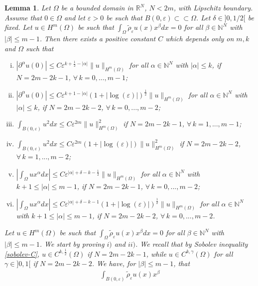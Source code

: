\documentclass[11pt,a4paper]{amsart}
\numberwithin{equation}{section}
\newtheorem{lemma}[equation]{Lemma}
\begin{document}
\begin{lemma}\label{meanlemma}
Let $\Omega$ be a bounded domain in $\mathbb R^N$, $N<2m$, with Lipschitz boundary. Assume that $0\in\Omega$ and let $\varepsilon>0$ be such that $B(0,\varepsilon)\subset\subset\Omega$. Let $\delta\in]0,1/2[$ be fixed. Let $u\in H^m(\Omega)$ be such that $\int_{\Omega}\tilde\rho_{\varepsilon} u(x) x^{\beta} dx=0$ for all $\beta\in\mathbb N^N$ with $|\beta|\leq m-1$. Then there exists a positive constant $C$ which depends only on $m,k$ and $\Omega$ such that
\begin{enumerate}[i)]
\item $|\partial^{\alpha}u(0)|\leq C\varepsilon^{k+\frac{1}{2}-|\alpha|}\|u\|_{H^m(\Omega)}$ for all $\alpha\in\mathbb N^N$ with $|\alpha|\leq k$, if $N=2m-2k-1$, $\forall\,k=0,...,m-1$;
\item $|\partial^{\alpha}u(0)|\leq C\varepsilon^{k+1-|\alpha|}(1+|\log(\varepsilon)|)^{\frac{1}{2}}\|u\|_{H^m(\Omega)}$ for all $\alpha\in\mathbb N^N$ with $|\alpha|\leq k$,  if $N=2m-2k-2$, $\forall\,k=0,...,m-2$;
\item $\int_{B(0,\varepsilon)}u^2dx\leq C\varepsilon^{2m}\|u\|_{H^m(\Omega)}^2$ if $N=2m-2k-1$, $\forall\,k=1,...,m-1$;
\item $\int_{B(0,\varepsilon)}u^2dx\leq C\varepsilon^{2m} (1+|\log(\varepsilon)|)\|u\|_{H^m(\Omega)}^2$ if $N=2m-2k-2$, $\forall\,k=1,...,m-2$;
\item $\left|\int_{\Omega}u x^{\alpha}dx\right|\leq C\varepsilon^{|\alpha|+\delta-k-\frac{1}{2}}\|u\|_{H^m(\Omega)}$ for all $\alpha\in\mathbb N^N$ with $k+1\leq|\alpha|\leq m-1$,  if $N=2m-2k-1$, $\forall\,k=0,...,m-2$;
\item $\left|\int_{\Omega}u x^{\alpha}dx\right|\leq C\varepsilon^{|\alpha|+\delta-k-1}(1+|\log(\varepsilon)|)^{\frac{1}{2}}\|u\|_{H^m(\Omega)}$ for all $\alpha\in\mathbb N^N$ with $k+1\leq|\alpha|\leq m-1$,  if $N=2m-2k-2$, $\forall\,k=0,...,m-2$.
\end{enumerate}
\proof
Let $u\in H^m(\Omega)$ be such that $\int_{\Omega}\tilde\rho_{\varepsilon} u(x) x^{\beta} dx=0$ for all $\beta\in\mathbb N^N$ with $|\beta|\leq m-1$. We start by proving $i)$ and $ii)$. We recall that by Sobolev inequality \eqref{sobolev-C}, $u\in C^{k,\frac{1}{2}}(\Omega)$ if $N=2m-2k-1$, while $u\in C^{k,\gamma}(\Omega)$ for all $\gamma\in]0,1[$ if $N=2m-2k-2$.  We have, for $|\beta|\leq m-1$, that
\begin{multline}\label{ultimo}
\int_{B(0,\varepsilon)}\tilde\rho_{\varepsilon}u(x) x^{\beta}\\

\end{multline}
\end{lemma}
\end{document}
